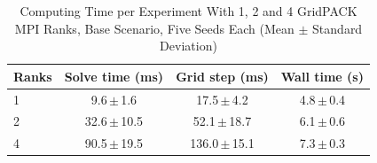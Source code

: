 \begin{table}[t]
\caption{Computing Time per Experiment With 1, 2 and 4 GridPACK MPI Ranks, Base Scenario, Five Seeds Each (Mean $\pm$ Standard Deviation)}
\label{tab:mpi}
\centering
\footnotesize
\begin{tabular}{@{}lccc@{}}
\toprule
Ranks & Solve time (ms) & Grid step (ms) & Wall time (s) \\
\midrule
1 & 9.6\,$\pm$\,1.6 & 17.5\,$\pm$\,4.2 & 4.8\,$\pm$\,0.4 \\
2 & 32.6\,$\pm$\,10.5 & 52.1\,$\pm$\,18.7 & 6.1\,$\pm$\,0.6 \\
4 & 90.5\,$\pm$\,19.5 & 136.0\,$\pm$\,15.1 & 7.3\,$\pm$\,0.3 \\
\bottomrule
\end{tabular}
\end{table}
